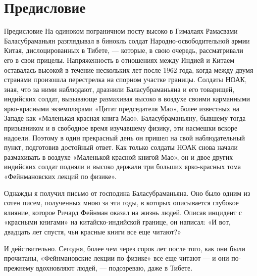 \documentclass[11pt,oneside]{article}
\begin{document}
\section*{Предисловие}



\label{tips-sec-2-предисловие}


Предисловие На одиноком пограничном посту высоко в Гималаях Рамасвами Баласубраманьян разглядывал в бинокль солдат Народно-освободительной армии Китая, дислоцированных в Тибете, --- которые, в свою очередь, рассматривали его в свои прицелы. Напряженность в отношениях между Индией и Китаем оставалась высокой в течение нескольких лет после 1962 года, когда между двумя странами произошла перестрелка на спорном участке границы. Солдаты НОАК, зная, что за ними наблюдают, дразнили Баласубраманьяна и его товарищей, индийских солдат, вызывающе размахивая высоко в воздухе своими карманными ярко-красными экземплярами «Цитат председателя Мао», более известных на Западе как «Маленькая красная книга Мао». Баласубраманьяну, бывшему тогда призывником и в свободное время изучавшему физику, эти насмешки вскоре надоели. Поэтому в один прекрасный день он пришел на свой наблюдательный пункт, подготовив достойный ответ. Как только солдаты НОАК снова начали размахивать в воздухе «Маленькой красной книгой Мао», он и двое других индийских солдат подняли и высоко держали три больших ярко-красных тома «Фейнмановских лекций по физике».\par



Однажды я получил письмо от господина Баласубраманьяна. Оно было одним из сотен писем, полученных мною за эти годы, в которых описывается глубокое влияние, которое Ричард Фейнман оказал на жизнь людей. Описав инцидент с «красными книгами» на китайско-индийской границе, он написал: «И вот, двадцать лет спустя, чьи красные книги все еще читают?»\par



И действительно. Сегодня, более чем через сорок лет после того, как они были прочитаны, «Фейнмановские лекции по физике» все еще читают --- и они по-прежнему вдохновляют людей, --- подозреваю, даже в Тибете.\par
\end{document}
